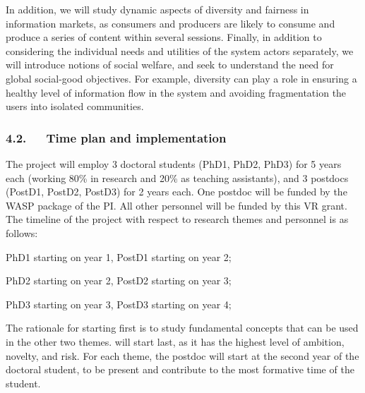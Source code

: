 \documentclass[a4paper,11pt]{article}
\begin{document}
In addition, we will study dynamic aspects of diversity and fairness in information markets,
as consumers and producers are likely to consume and produce a series of content within several sessions.
Finally, in addition to considering the individual needs and utilities of the system actors separately, 
we will introduce notions of social welfare, 
and seek to understand the need for global social-good objectives.
For example, diversity can play a role in ensuring a healthy level of information flow in the system
and avoiding fragmentation the users into isolated communities.

\vspace{-1mm}
\subsubsection*{4.2.~~~Time plan and implementation}
\vspace{-1mm}


The project will employ 3 doctoral students (PhD1, PhD2, PhD3) for 5 years each 
(working 80\% in research and 20\% as teaching assistants), 
and 3 postdocs (PostD1, PostD2, PostD3) for 2 years each. 
%
One postdoc will be funded by the WASP package of the PI. All other personnel will be funded by this VR grant.
%
The timeline of the project with respect to research themes and personnel is as follows:
\vspace{-2mm}
\begin{description}
\setlength{\itemsep}{-4pt}
\item[1.~~{\exploration}\,:] 
PhD1 starting on year 1, PostD1 starting on year 2;
\item[2.~~{\networks}\,:]
PhD2 starting on year 2, PostD2 starting on year 3;
\item[3.~~{\markets}\,:]
PhD3 starting on year 3, PostD3 starting on year 4;
\end{description}
\vspace{-2mm}
The rationale for \exploration starting first is to study 
fundamental concepts that can be used in the other two themes.
\markets will start last, as it has the highest level of ambition, novelty, and risk.
For each theme, the postdoc will start at the second year of the doctoral student, 
to be present and contribute to the most formative time of the student. 
\end{document}
